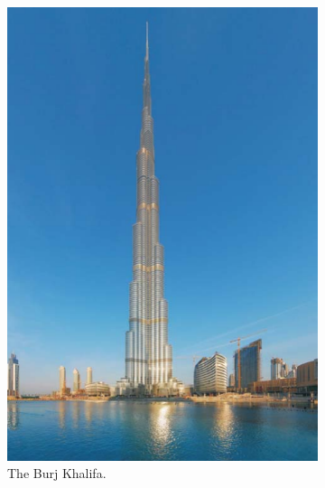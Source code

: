 \documentclass[11pt]{article}
\begin{document}
\begin{figure}[!htb]
	\centering
	\begin{subfigure}[b]{0.45\textwidth}
		\includegraphics[width=\textwidth]{vortex3}
		\caption{The Burj Khalifa.}
		\label{fig:vortex3}
	\end{subfigure}
	\hfill
	\begin{subfigure}[b]{0.45\textwidth}

\end{subfigure}
\end{figure}
\end{document}

